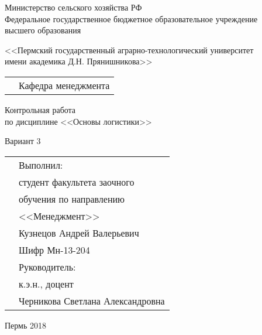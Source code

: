\thispagestyle{empty}
\begin{center}
	Министерство сельского хозяйства РФ \\Федеральное государственное бюджетное образовательное учреждение\\ высшего образования
	\vspace{0.5ex}
	
	<<Пермский государственный аграрно-технологический университет\\ имени академика Д.Н. Прянишникова>>
\end{center}
\vspace{10ex}
\begin{tabularx}{\textwidth}{XX}
	& Кафедра менеджмента %
\end{tabularx}
\begin{center}
	\vspace{13ex}
	Контрольная работа\\
	по дисциплине <<Основы логистики>> \\
	\vspace{1ex}
	
	Вариант 3
\end{center}
	\vspace{8ex}
	\begin{tabularx}{\textwidth}{XX}
	& Выполнил:\\
	& студент факультета заочного \\
	& обучения по направлению \\
	& <<Менеджмент>> \\
	& Кузнецов Андрей Валерьевич \\
	& Шифр Мн-13-204\\
	& Руководитель:\\
	& к.э.н., доцент\\
	& Черникова Светлана Александровна\\
	\end{tabularx}
\begin{center}
	\vfill
	Пермь 2018
\end{center}
